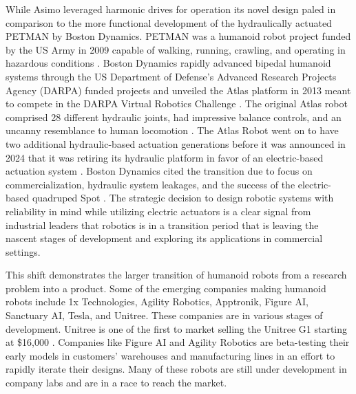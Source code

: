\documentclass{article}
\begin{document}
While Asimo leveraged harmonic drives for operation its novel design paled in comparison to the more functional development of the hydraulically actuated PETMAN by Boston Dynamics. PETMAN was a humanoid robot project funded by the US Army in 2009 capable of walking, running, crawling, and operating in hazardous conditions \cite{guizzo2011}.  Boston Dynamics rapidly advanced bipedal humanoid systems through the US Department of Defense's Advanced Research Projects Agency (DARPA) funded projects and unveiled the Atlas platform in 2013 meant to compete in the DARPA Virtual Robotics Challenge \cite{franzen2013}. The original Atlas robot comprised 28 different hydraulic joints, had impressive balance controls, and an uncanny resemblance to human locomotion \cite{franzen2013}. The Atlas Robot went on to have two additional hydraulic-based actuation generations before it was announced in 2024 that it was retiring its hydraulic platform in favor of an electric-based actuation system \cite{ackerman2024}. Boston Dynamics cited the transition due to focus on commercialization, hydraulic system leakages, and the success of the electric-based quadruped Spot \cite{ackerman2024}. The strategic decision to design robotic systems with reliability in mind while utilizing electric actuators is a clear signal from industrial leaders that robotics is in a transition period that is leaving the nascent stages of development and exploring its applications in commercial settings.

This shift demonstrates the larger transition of humanoid robots from a research problem into a product. Some of the emerging companies making humanoid robots include 1x Technologies, Agility Robotics, Apptronik, Figure AI, Sanctuary AI, Tesla, and Unitree. These companies are in various stages of development. Unitree is one of the first to market selling the Unitree G1 starting at \$16,000 \cite{unitree2016}. Companies like Figure AI and Agility Robotics are beta-testing their early models in customers' warehouses and manufacturing lines in an effort to rapidly iterate their designs. Many of these robots are still under development in company labs and are in a race to reach the market. 
\end{document}
